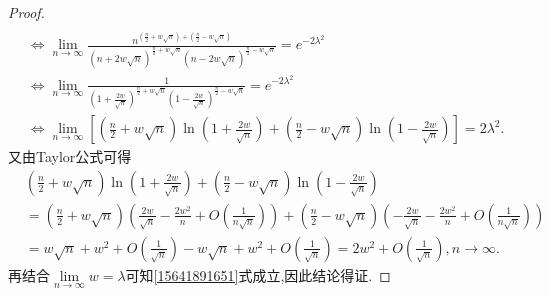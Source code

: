\documentclass[../../main.tex]{subfiles}%
\begin{document}
\begin{proof}
\begin{align}
\nonumber
\\
&\iff \lim_{n\rightarrow \infty} \frac{n^{\left( \frac{n}{2}+w\sqrt{n} \right) +\left( \frac{n}{2}-w\sqrt{n} \right)}}{(n+2w\sqrt{n})^{\frac{n}{2}+w\sqrt{n}}(n-2w\sqrt{n})^{\frac{n}{2}-w\sqrt{n}}}=e^{-2\lambda ^2}
\nonumber
\\
&\iff \lim_{n\rightarrow \infty} \frac{1}{\left( 1+\frac{2w}{\sqrt{n}} \right) ^{\frac{n}{2}+w\sqrt{n}}\left( 1-\frac{2w}{\sqrt{n}} \right) ^{\frac{n}{2}-w\sqrt{n}}}=e^{-2\lambda ^2}
\nonumber
\\
&\iff \lim_{n\rightarrow \infty} \left[ \left( \frac{n}{2}+w\sqrt{n} \right) \ln \left( 1+\frac{2w}{\sqrt{n}} \right) +\left( \frac{n}{2}-w\sqrt{n} \right) \ln \left( 1-\frac{2w}{\sqrt{n}} \right) \right] =2\lambda ^2.\label{15641891651}
\end{align}
又由Taylor公式可得
\begin{align*}
&\left( \frac{n}{2}+w\sqrt{n} \right) \ln \left( 1+\frac{2w}{\sqrt{n}} \right) +\left( \frac{n}{2}-w\sqrt{n} \right) \ln \left( 1-\frac{2w}{\sqrt{n}} \right) 
\\
&=\left( \frac{n}{2}+w\sqrt{n} \right) \left( \frac{2w}{\sqrt{n}}-\frac{2w^2}{n}+O\left( \frac{1}{n\sqrt{n}} \right) \right) +\left( \frac{n}{2}-w\sqrt{n} \right) \left( -\frac{2w}{\sqrt{n}}-\frac{2w^2}{n}+O\left( \frac{1}{n\sqrt{n}} \right) \right) 
\\
&=w\sqrt{n}+w^2+O\left( \frac{1}{\sqrt{n}} \right) -w\sqrt{n}+w^2+O\left( \frac{1}{\sqrt{n}} \right) =2w^2+O\left( \frac{1}{\sqrt{n}} \right) ,n\to \infty.
\end{align*}
再结合$\underset{n\rightarrow \infty}{\lim}w=\lambda$可知\eqref{15641891651}式成立,因此结论得证.
\end{proof}
\end{document}
